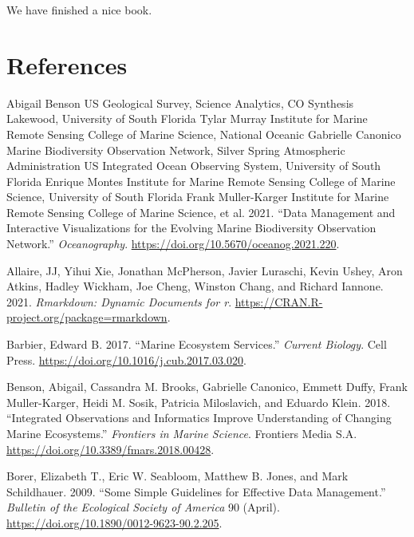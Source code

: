 \documentclass[
]{book}
\newlength{\cslhangindent}
\newlength{\cslentryspacingunit} %
\newenvironment{CSLReferences}[2] %
 {%
  \setlength{\parindent}{0pt}
  \ifodd #1
  \let\oldpar\par
  \def\par{\hangindent=\cslhangindent\oldpar}
  \fi
  \setlength{\parskip}{#2\cslentryspacingunit}
 }%
 {}
\begin{document}
We have finished a nice book.

\hypertarget{references}{%
\chapter*{References}\label{references}}

\hypertarget{refs}{}
\begin{CSLReferences}{1}{0}
\leavevmode{}%
Abigail Benson \textbar{} US Geological Survey, Science Analytics, CO Synthesis Lakewood, University of South Florida Tylar Murray \textbar{} Institute for Marine Remote Sensing College of Marine Science, National Oceanic Gabrielle Canonico \textbar{} Marine Biodiversity Observation Network, Silver Spring Atmospheric Administration US Integrated Ocean Observing System, University of South Florida Enrique Montes \textbar{} Institute for Marine Remote Sensing College of Marine Science, University of South Florida Frank Muller-Karger \textbar{} Institute for Marine Remote Sensing College of Marine Science, et al. 2021. {``Data Management and Interactive Visualizations for the Evolving Marine Biodiversity Observation Network.''} \emph{Oceanography}. \url{https://doi.org/10.5670/oceanog.2021.220}.

\leavevmode{}%
Allaire, JJ, Yihui Xie, Jonathan McPherson, Javier Luraschi, Kevin Ushey, Aron Atkins, Hadley Wickham, Joe Cheng, Winston Chang, and Richard Iannone. 2021. \emph{Rmarkdown: Dynamic Documents for r}. \url{https://CRAN.R-project.org/package=rmarkdown}.

\leavevmode{}%
Barbier, Edward B. 2017. {``Marine Ecosystem Services.''} \emph{Current Biology}. Cell Press. \url{https://doi.org/10.1016/j.cub.2017.03.020}.

\leavevmode{}%
Benson, Abigail, Cassandra M. Brooks, Gabrielle Canonico, Emmett Duffy, Frank Muller-Karger, Heidi M. Sosik, Patricia Miloslavich, and Eduardo Klein. 2018. {``Integrated Observations and Informatics Improve Understanding of Changing Marine Ecosystems.''} \emph{Frontiers in Marine Science}. Frontiers Media S.A. \url{https://doi.org/10.3389/fmars.2018.00428}.

\leavevmode{}%
Borer, Elizabeth T., Eric W. Seabloom, Matthew B. Jones, and Mark Schildhauer. 2009. {``Some Simple Guidelines for Effective Data Management.''} \emph{Bulletin of the Ecological Society of America} 90 (April). \url{https://doi.org/10.1890/0012-9623-90.2.205}.


\end{CSLReferences}
\end{document}
